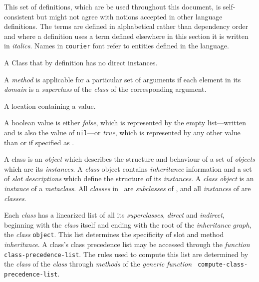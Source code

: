 \begin{optPrivate}
\end{optPrivate}
\begin{optDefinition}
\label{sec:definitions}
This set of definitions, which are be used throughout this document, is
self-consistent but might not agree with notions accepted in other language
definitions.  The terms are defined in alphabetical rather than dependency order
and where a definition uses a term defined elsewhere in this section it is
written in {\em italics}.  Names in {\tt courier} font refer to entities defined
in the language.
%
\begin{definitions}
    A Class that by definition has no direct instances.

     
     A {\em method} is applicable for a
    particular set of arguments if each element in its {\em domain} is a {\em
        superclass} of the {\em class} of the corresponding argument.

    A location containing a value.

     A boolean value is either {\em
        false}, which is represented by the empty
    list---written \nil{}\/ and is also the value of {\tt nil}---or {\em
        true}, which is represented by any other value than
    \nil{} or if specified as \true.

     A class is an {\em object} which
    describes the structure and behaviour of a set of {\em objects} which are
    its {\em instances}.  A {\em class} object contains {\em inheritance}
    information and a set of {\em slot descriptions} which define the structure
    of its {\em instances}.  A {\em class} {\em object} is an {\em instance} of
    a {\em metaclass}.  All {\em classes} in \eulisp\ are {\em subclasses} of
    {}, and all {\em instances} of {} are {\em
        classes}.

     
    Each {\em class} has a linearized list of all its {\em superclasses}, {\em
        direct} and {\em indirect}, beginning with the {\em class} itself and
    ending with the root of the {\em inheritance} {\em graph}, the {\em class}
    {\tt object}.  This list determines the specificity of slot and method {\em
        inheritance}.  A class's class precedence list may be accessed through
    the {\em function} {\tt class-precedence-list}. The rules used to compute
    this list are determined by the {\em class} of the {\em class} through {\em
        methods} of the {\em generic} {\em function} {\tt
        compute-class-precedence-list}.


\end{definitions}
\end{optDefinition}
